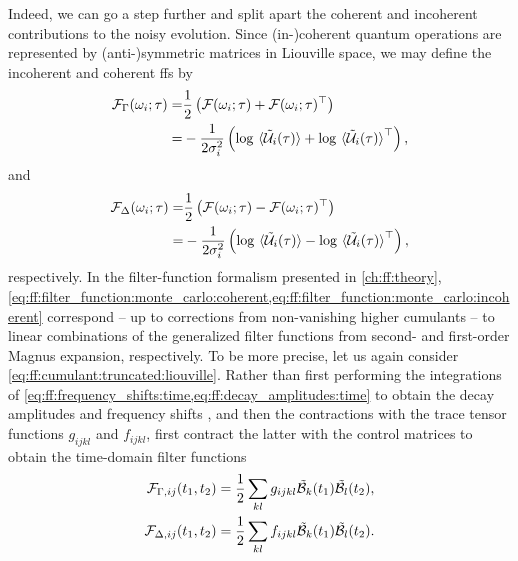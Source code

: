Indeed, we can go a step further and split apart the coherent and incoherent contributions to the noisy evolution.
Since (in-)coherent quantum operations are represented by (anti-)symmetric matrices in Liouville space, we may define the incoherent and coherent \glspl{ff} by
\begin{equation}\label{eq:ff:filter_function:monte_carlo:incoherent}
    \begin{split}
        \mc{F}_\decayamps(\omega_i;\tau) =& \frac{1}{2}\left(\mc{F}(\omega_i;\tau) + \mc{F}(\omega_i;\tau)\transpose\right) \\
                                         =& -\frac{1}{2\sigma_i^2}\left(\log\ev*{\liouvUe_i(\tau)} + \log\ev*{\liouvUe_i(\tau)}\transpose\right),
    \end{split}
\end{equation}
and
\begin{equation}\label{eq:ff:filter_function:monte_carlo:coherent}
    \begin{split}
        \mc{F}_\freqshifts(\omega_i;\tau) =& \frac{1}{2}\left(\mc{F}(\omega_i;\tau) - \mc{F}(\omega_i;\tau)\transpose\right) \\
                                          =& -\frac{1}{2\sigma_i^2}\left(\log\ev*{\liouvUe_i(\tau)} - \log\ev*{\liouvUe_i(\tau)}\transpose\right),
    \end{split}
\end{equation}
respectively.
In the filter-function formalism presented in \cref{ch:ff:theory}, \cref{eq:ff:filter_function:monte_carlo:coherent,eq:ff:filter_function:monte_carlo:incoherent} correspond -- up to corrections from non\hyp{}vanishing higher cumulants -- to linear combinations of the generalized filter functions from second- and first-order Magnus expansion, respectively.
To be more precise, let us again consider \cref{eq:ff:cumulant:truncated:liouville}.
Rather than first performing the integrations of \cref{eq:ff:frequency_shifts:time,eq:ff:decay_amplitudes:time} to obtain the decay amplitudes \decayamps and frequency shifts \freqshifts, and then the contractions with the trace tensor functions $g_{ijkl}$ and $f_{ijkl}$, first contract the latter with the control matrices to obtain the time-domain filter functions
\begin{align}
    \mathcal{F}_{\Gamma,ij}(t_1, t_2) &= \frac{1}{2}\sum_{kl} g_{ijkl}\tilde{\mathcal{B}}_{k}(t_1)\tilde{\mathcal{B}}_{l}(t_2), \label{eq:ff:filter_function:cumulant:incoherent}\\
    \mathcal{F}_{\Delta,ij}(t_1, t_2) &= \frac{1}{2}\sum_{kl} f_{ijkl}\tilde{\mathcal{B}}_{k}(t_1)\tilde{\mathcal{B}}_{l}(t_2). \label{eq:ff:filter_function:cumulant:coherent}
\end{align}
